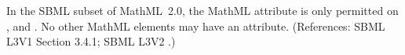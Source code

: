 In the SBML subset of MathML~2.0, the MathML attribute
 is only permitted on ,
 and .  No other
MathML elements may have an  attribute.
(References: SBML L3V1 Section 3.4.1; SBML L3V2 .)
